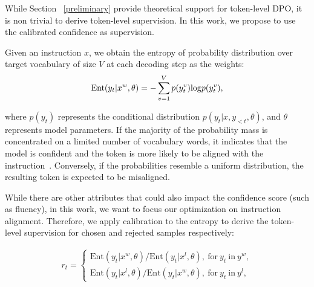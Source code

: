 While Section ~\ref{preliminary} provide theoretical support for token-level DPO, it is non trivial to derive token-level supervision. In this work, we propose to use the calibrated confidence as supervision.

Given an instruction $x$, we obtain the entropy of probability distribution over target vocabulary of size $V$ at each decoding step as the weights:
\vspace{-2mm}
\begin{equation} 
\textrm{Ent}(y_t|x^{w}, \theta) = - \sum_{v=1}^{V}p(y_t^v)\mathrm{log}p(y_t^v),
\vspace{-1mm}
\end{equation}


\noindent where $p(y_t)$ represents the conditional distribution $p(y_t|x, y_{<t}, \theta)$, and $\theta$ represents model parameters. If the majority of the probability mass is concentrated on a limited number of vocabulary words, it indicates that the model is confident and the token is more likely to be aligned with the instruction~\cite{fomicheva2020unsupervised}. Conversely, if the probabilities resemble a uniform distribution, the resulting token is expected to be misaligned.


While there are other attributes that could also impact the confidence score (such as fluency), in this work, we want to focus our optimization on instruction alignment. Therefore, we apply calibration to the entropy to derive the token-level supervision for chosen and rejected samples respectively:

\vspace{-4mm}

\begin{align*} r_t =
\left\{  
  \begin{array}{ll}
    \textrm{Ent}(y_t|x^{w}, \theta) / \textrm{Ent}(y_t|x^{l}, \theta),\ \text{for}\ y_t\ \text{in}\ y^w, \\
    \textrm{Ent}(y_t|x^{l}, \theta) / \textrm{Ent}(y_t|x^{w}, \theta),\ \text{for}\ y_t\ \text{in}\ y^l,
  \end{array}
\right.
\end{align*}

